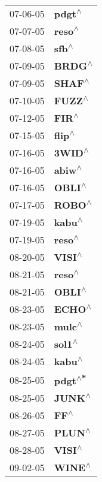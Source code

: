 \begin{supertabular}{p{0.08\textwidth}p{0.2\textwidth}}
 07-06-05 &    \textbf{pdgt\textsuperscript{$\wedge$}} \\
 07-07-05 &    \textbf{reso\textsuperscript{$\wedge$}} \\
 07-08-05 &     \textbf{sfb\textsuperscript{$\wedge$}} \\
 07-09-05 &    \textbf{BRDG\textsuperscript{$\wedge$}} \\
 07-09-05 &    \textbf{SHAF\textsuperscript{$\wedge$}} \\
 07-10-05 &    \textbf{FUZZ\textsuperscript{$\wedge$}} \\
 07-12-05 &     \textbf{FIR\textsuperscript{$\wedge$}} \\
 07-15-05 &    \textbf{flip\textsuperscript{$\wedge$}} \\
 07-16-05 &    \textbf{3WID\textsuperscript{$\wedge$}} \\
 07-16-05 &    \textbf{abiw\textsuperscript{$\wedge$}} \\
 07-16-05 &    \textbf{OBLI\textsuperscript{$\wedge$}} \\
 07-17-05 &    \textbf{ROBO\textsuperscript{$\wedge$}} \\
 07-19-05 &    \textbf{kabu\textsuperscript{$\wedge$}} \\
 07-19-05 &    \textbf{reso\textsuperscript{$\wedge$}} \\
 08-20-05 &    \textbf{VISI\textsuperscript{$\wedge$}} \\
 08-21-05 &    \textbf{reso\textsuperscript{$\wedge$}} \\
 08-21-05 &    \textbf{OBLI\textsuperscript{$\wedge$}} \\
 08-23-05 &    \textbf{ECHO\textsuperscript{$\wedge$}} \\
 08-23-05 &    \textbf{mulc\textsuperscript{$\wedge$}} \\
 08-24-05 &    \textbf{sol1\textsuperscript{$\wedge$}} \\
 08-24-05 &    \textbf{kabu\textsuperscript{$\wedge$}} \\
 08-25-05 &   \textbf{pdgt\textsuperscript{$\wedge$*}} \\
 08-25-05 &    \textbf{JUNK\textsuperscript{$\wedge$}} \\
 08-26-05 &      \textbf{FF\textsuperscript{$\wedge$}} \\
 08-27-05 &    \textbf{PLUN\textsuperscript{$\wedge$}} \\
 08-28-05 &    \textbf{VISI\textsuperscript{$\wedge$}} \\
 09-02-05 &    \textbf{WINE\textsuperscript{$\wedge$}} \\

\end{supertabular}
